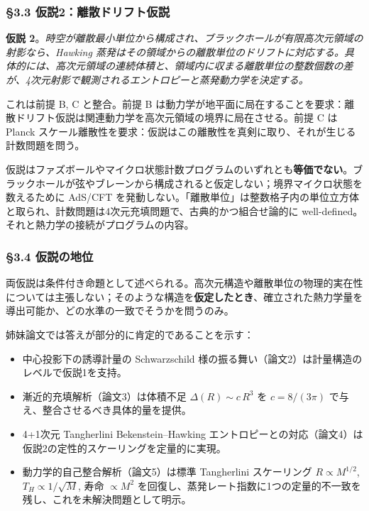 \documentclass[a4paper,11pt]{ltjsarticle}
\theoremstyle{definition}
\providecommand{\tightlist}{\setlength{\itemsep}{0pt}\setlength{\parskip}{0pt}}
\begin{document}
\subsubsection{§3.3
仮説2：離散ドリフト仮説}\label{ux4eeeux8aac2ux96e2ux6563ux30c9ux30eaux30d5ux30c8ux4eeeux8aac}

\textbf{仮説
2}。\emph{時空が離散最小単位から構成され、ブラックホールが有限高次元領域の射影なら、Hawking
蒸発はその領域からの離散単位のドリフトに対応する。具体的には、高次元領域の連続体積と、領域内に収まる離散単位の整数個数の差が、4次元射影で観測されるエントロピーと蒸発動力学を決定する。}

これは前提 B, C と整合。前提 B
は動力学が地平面に局在することを要求：離散ドリフト仮説は関連動力学を高次元領域の境界に局在させる。前提
C は Planck
スケール離散性を要求：仮説はこの離散性を真剣に取り、それが生じる計数問題を問う。

仮説はファズボールやマイクロ状態計数プログラムのいずれとも\textbf{等価でない}。ブラックホールが弦やブレーンから構成されると仮定しない；境界マイクロ状態を数えるために
AdS/CFT
を発動しない。「離散単位」は整数格子内の単位立方体と取られ、計数問題は4次元充填問題で、古典的かつ組合せ論的に
well-defined。それと熱力学の接続がプログラムの内容。

\subsubsection{§3.4 仮説の地位}\label{ux4eeeux8aacux306eux5730ux4f4d}

両仮説は条件付き命題として述べられる。高次元構造や離散単位の物理的実在性については主張しない；そのような構造を\textbf{仮定したとき}、確立された熱力学量を導出可能か、どの水準の一致でそうかを問うのみ。

姉妹論文では答えが部分的に肯定的であることを示す：

\begin{itemize}
\tightlist
\item
  中心投影下の誘導計量の Schwarzschild
  様の振る舞い（論文2）は計量構造のレベルで仮説1を支持。
\item
  漸近的充填解析（論文3）は体積不足 \(\Delta(R) \sim c\,R^3\) を
  \(c = 8/(3\pi)\) で与え、整合させるべき具体的量を提供。
\item
  4+1次元 Tangherlini Bekenstein--Hawking
  エントロピーとの対応（論文4）は仮説2の定性的スケーリングを定量的に実現。
\item
  動力学的自己整合解析（論文5）は標準 Tangherlini スケーリング
  \(R \propto M^{1/2}\), \(T_H \propto 1/\sqrt{M}\), 寿命
  \(\propto M^2\)
  を回復し、蒸発レート指数に1つの定量的不一致を残し、これを未解決問題として明示。
\end{itemize}
\end{document}
